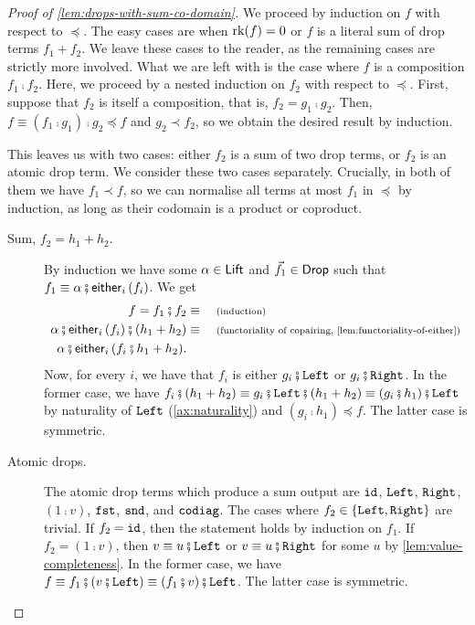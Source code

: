 \begin{proof}[Proof of \cref{lem:drops-with-sum-co-domain}]
	We proceed by induction on $f$ with respect to $\preceq$. The easy cases are when $\mathrm{rk}(f) = 0$ or $f$ is a literal sum of drop terms $f_1 + f_2$. We leave these cases to the reader, as the remaining cases are strictly more involved. What we are left with is the case where $f$ is a composition $f_1 \comp f_2$. Here, we proceed by a nested induction on $f_2$ with respect to $\preceq$. First, suppose that $f_2$ is itself a composition, that is, $f_2 = g_1 \comp g_2$. Then, $f \equiv (f_1 \comp g_1) \comp g_2 \preceq f$ and $g_2 \prec f_2$, so we obtain the desired result by induction. 

	This leaves us with two cases: either $f_2$ is a sum of two drop terms, or $f_2$ is an atomic drop term. We consider these two cases separately. Crucially, in both of them we have $f_1 \prec f$, so we can normalise all terms at most $f_1$ in $\preceq$ by induction, as long as their codomain is a product or coproduct.

	\begin{description}
		\item[Sum, $f_2 = h_1 + h_2$.] By induction we have some $\alpha \in \mathsf{Lift}$ and $\vec f_1 \in \mathsf{Drop}$ such that $f_1 \equiv \alpha \comp \eithermany{i}{(f_i)}$. We get
		\begin{align*}
			f = f_1 \comp f_2 \equalbecause{induction} \\ 
			\alpha \comp \eithermany{i}{(f_i)} \comp (h_1 + h_2) \equalbecause{functoriality of copairing, \cref{lem:functoriality-of-either}} \\ 
			\alpha \comp \eithermany{i}{(f_i \comp h_1 + h_2)}.
		\end{align*}
		Now, for every $i$, we have that $f_i$ is either $g_i \comp \leftterm$ or $g_i \comp \rightterm$. In the former case, we have $f_i \comp (h_1 + h_2) \equiv g_i \comp \leftterm \comp (h_1 + h_2) \equiv (g_i \comp h_1) \comp \leftterm$ by naturality of $\mathtt{Left}$ (\cref{ax:naturality}) and $(g_i\comp{}h_1) \preceq f$. The latter case is symmetric.

		\item[Atomic drops.] The atomic drop terms which produce a sum output are $\mathtt{id}$, $\mathtt{Left}$, $\mathtt{Right}$, $(1\comp{}v)$, $\mathtt{fst}$, $\mathtt{snd}$, and $\mathtt{codiag}$. The cases where $f_2 \in \{ \mathtt{Left}, \mathtt{Right} \}$ are trivial. If $f_2 = \mathtt{id}$, then the statement holds by induction on $f_1$. If $f_2 = (1\comp{}v)$, then $v \equiv u\comp\leftterm$ or $v \equiv u\comp\rightterm$ for some  $u$ by \cref{lem:value-completeness}. In the former case, we have $f \equiv f_1 \comp (v \comp \leftterm) \equiv (f_1 \comp v) \comp \leftterm$. The latter case is symmetric. 
		

\end{description}
\end{proof}
